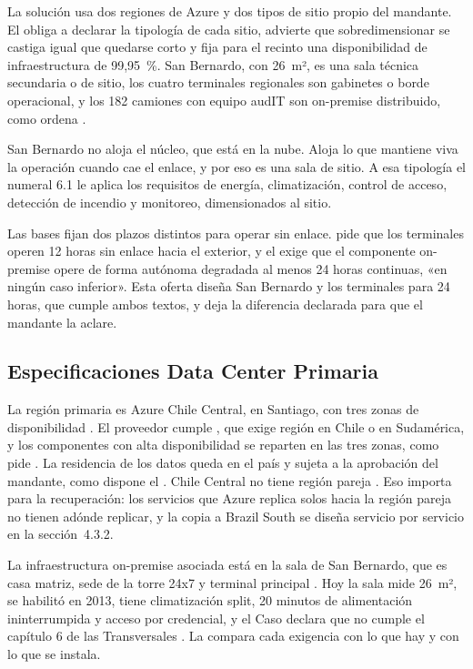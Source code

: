 La solución usa dos regiones de Azure y dos tipos de sitio propio del mandante. El  obliga a declarar la tipología de cada sitio, advierte que sobredimensionar se castiga igual
que quedarse corto y fija para el recinto una disponibilidad de infraestructura de 99,95~\%. San Bernardo,
con 26~m², es una sala técnica secundaria o de sitio, los cuatro terminales regionales son gabinetes o
borde operacional, y los 182 camiones con equipo audIT son on-premise distribuido, como ordena
.

San Bernardo no aloja el núcleo, que está en la nube. Aloja lo que mantiene viva la operación cuando
cae el enlace, y por eso es una sala de sitio. A esa tipología el numeral 6.1 le aplica los requisitos
de energía, climatización, control de acceso, detección de incendio y monitoreo, dimensionados al sitio.

Las bases fijan dos plazos distintos para operar sin enlace.  pide que los
terminales operen 12 horas sin enlace hacia el exterior, y el  exige que el componente
on-premise opere de forma autónoma degradada al menos 24 horas continuas, «en ningún caso inferior». Esta
oferta diseña San Bernardo y los terminales para 24 horas, que cumple ambos textos, y deja la diferencia
declarada para que el mandante la aclare.

\subsection{Especificaciones Data Center Primaria}\label{sec:4-dc-primario}

La región primaria es Azure Chile Central, en Santiago, con tres zonas de disponibilidad
\parencite{ms_regions}. El proveedor cumple , que exige región en Chile o en
Sudamérica, y los componentes con alta disponibilidad se reparten en las tres zonas, como pide
. La residencia de los datos queda en el país y sujeta a la aprobación del mandante,
como dispone el . Chile Central no tiene región pareja \parencite{ms_regions}. Eso importa
para la recuperación: los servicios que Azure replica solos hacia la región pareja no tienen adónde
replicar, y la copia a Brazil South se diseña servicio por servicio en la sección~4.3.2.

La infraestructura on-premise asociada está en la sala de San Bernardo, que es casa matriz, sede de la
torre 24x7 y terminal principal . Hoy la sala mide 26~m², se habilitó en 2013,
tiene climatización split, 20 minutos de alimentación ininterrumpida y acceso por credencial, y el Caso
declara que no cumple el capítulo 6 de las Transversales . La
 compara cada exigencia con lo que hay y con lo que se instala.

